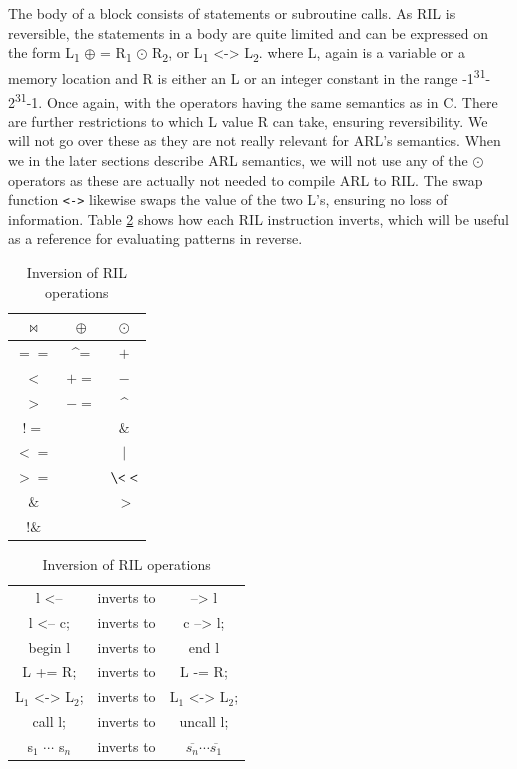 \documentclass[a4paper]{article}
\begin{document}
The body of a block consists of statements or subroutine calls. As RIL is reversible, the statements in a body are quite limited and can be expressed on the form L\textsubscript{1} \(\oplus\) = R\textsubscript{1} \(\odot\) R\textsubscript{2}, or L\textsubscript{1} <-> L\textsubscript{2}. where L, again is a variable or a memory location and R is either an L or an integer constant in the range -1\textsuperscript{31}-2\textsuperscript{31}-1. Once again, with the operators having the same semantics as in C. There are further restrictions to which L value R can take, ensuring reversibility. We will not go over these as they are not really relevant for ARL's semantics. When we in the later sections describe ARL semantics, we will not use any of the \(\odot\) operators as these are actually not needed to compile ARL to RIL. The swap function \texttt{<->} likewise swaps the value of the two L's, ensuring no loss of information. Table \ref{invop} shows how each RIL instruction inverts, which will be useful as a reference for evaluating patterns in reverse.

\begin{table}[ht]
\begin{minipage}{0.4\textwidth}
\centering
\begin{tabular}{|c|c|c|}
  $\bowtie$ & $\oplus$ & $\odot$ \\
  \hline
$==$  & \textasciicircum = & $+$ \\
$<  $ & $+=$ & $- $  \\
$>  $ & $-=$ & \textasciicircum   \\
$!= $ &    & $\&  $  \\
$<= $ &    & $\vert$     \\
$>= $ &    & $\<< $  \\
$\& $  &    & $\>>$  \\
$!\&$  &    &      \\
\end{tabular}
\caption{RIL operators}
\label{operators}
\end{minipage}
\qquad
\begin{minipage}{0.5\textwidth}
\centering
\begin{tabular}{ccc}
l <-- & inverts to & --> l\\
l <-- c; & inverts to & c --> l;\\
begin l & inverts to & end l\\
L += R; & inverts to & L -= R;\\
L$_1$ <-> L$_2$; & inverts to &L$_1$ <-> L$_2$;\\
call l; & inverts to & uncall l;\\
s$_1$ $\cdots$ s$_n$ & inverts to & $\overline{s_n} \cdots \overline{s_1}$
\end{tabular}
\caption{Inversion of RIL operations}
\label{invop}
\end{minipage}
\end{table}
\end{document}
